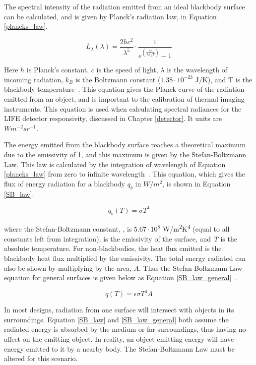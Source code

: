The spectral intensity of the radiation emitted from an ideal blackbody surface can be calculated, and is given by Planck's radiation law, in Equation \ref{plancks_law}.

\begin{equation}\label{plancks_law}
    L_{\lambda}(\lambda) = \frac{2hc^2}{\lambda^5}\cdot\frac{1}{e^{(\frac{hc}{\lambda k_B T})}-1}
\end{equation}

Here $h$ is Planck's constant, $c$ is the speed of light, $\lambda$ is the wavelength of incoming radiation, $k_B$ is the Boltzmann constant ($1.38\cdot 10^{-23}$ J/K), and T is the blackbody temperature~\citep{Heat_Transfer_Basics}. This equation gives the Planck curve of the radiation emitted from an object, and is important to the calibration of thermal imaging instruments. This equation is used when calculating spectral radiances for the LIFE detector responsivity, discussed in Chapter \ref{detector}. It units are $Wm^{-2}sr^{-1}$.

The energy emitted from the blackbody surface reaches a theoretical maximum due to the emissivity of 1, and this maximum is given by the Stefan-Boltzmann Law. This law is calculated by the integration of wavelength of Equation \ref{plancks_law} from zero to infinite wavelength~\citep{Heat_Transfer_Basics}. This equation, which gives the flux of energy radiation for a blackbody $q_b$ in $W/m^2$, is shown in Equation \ref{SB_law}.

\begin{equation} \label{SB_law}
    q_b(T) = \sigma T^{4}
\end{equation}

where the Stefan-Boltzmann constant, \textsigma, is $5.67\cdot10^8$ W/m\textsuperscript{2}K\textsuperscript{4} (equal to all constants left from integration), {\textepsilon} is the emissivity of the surface, and \textit{T} is the absolute temperature. For non-blackbodies, the heat flux emitted is the blackbody heat flux multiplied by the emissivity. The total energy radiated can also be shown by multiplying by the area, $A$. Thus the Stefan-Boltzmann Law equation for general surfaces is given below as Equation \ref{SB_law_general}~\citep{Heat_Transfer_Basics}.

\begin{equation} \label{SB_law_general}
    q(T) = \epsilon \sigma T^{4} A
\end{equation}

In most designs, radiation from one surface will intersect with objects in its surroundings. Equation \ref{SB_law} and \ref{SB_law_general} both assume the radiated energy is absorbed by the medium or far surroundings, thus having no affect on the emitting object. In reality, an object emitting energy will have energy emitted to it by a nearby body. The Stefan-Boltzmann Law must be altered for this scenario.

